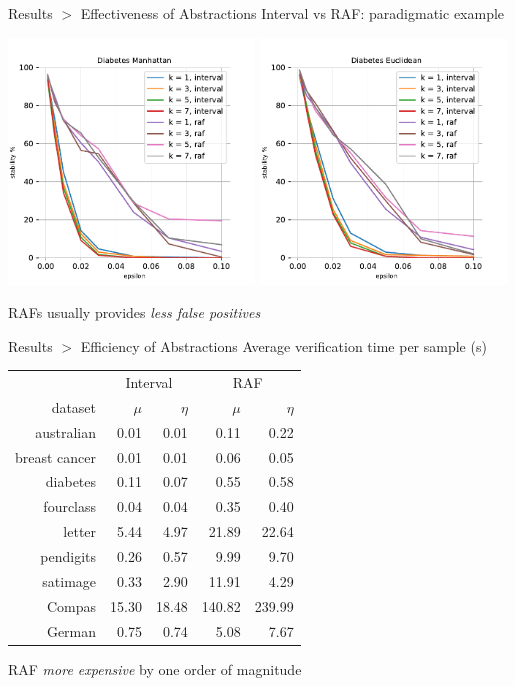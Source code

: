 \documentclass[11pt]{beamer}
\begin{document}
\begin{frame}{Results $>$ Effectiveness of Abstractions}
Interval vs RAF: paradigmatic example
\begin{center}
 \includegraphics[width=0.49\textwidth]{assets/charts/diabetes-manhattan}
 \includegraphics[width=0.49\textwidth]{assets/charts/diabetes-euclidean}
\end{center}
RAFs usually provides \emph{less false positives}
\end{frame}

\begin{frame}{Results $>$ Efficiency of Abstractions}
Average verification time per sample (s)
\begin{center}
 \begin{tabular}{r | r r | r r}
                & \multicolumn{2}{c|}{Interval} & \multicolumn{2}{c}{RAF}\\
  dataset       & $\mu$ & $\eta$ & $\mu$ & $\eta$\\
  \hline
  australian    &  0.01 &   0.01 &  0.11 &  0.22 \\  
  breast cancer &  0.01 &   0.01 &  0.06 &  0.05 \\  
  diabetes      &  0.11 &   0.07 &  0.55 &  0.58 \\  
  fourclass     &  0.04 &   0.04 &  0.35 &  0.40 \\  
  letter        &  5.44 &   4.97 & 21.89 & 22.64 \\  
  pendigits     &  0.26 &   0.57 &  9.99 &  9.70 \\  
  satimage      &  0.33 &   2.90 & 11.91 &  4.29 \\  
  \hline
  Compas        & 15.30 &  18.48 & 140.82& 239.99\\ 
  German        &  0.75 &   0.74 &  5.08&   7.67\\
 \end{tabular}
\end{center}
RAF \emph{more expensive} by one order of magnitude
\end{frame}
\end{document}
